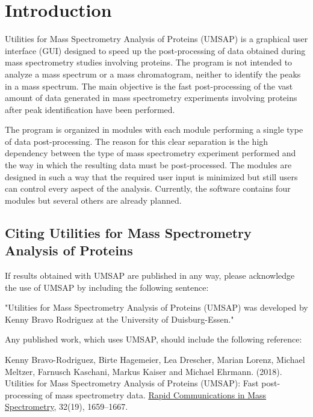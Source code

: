 \chapter{Introduction}

Utilities for Mass Spectrometry Analysis of Proteins (UMSAP) is a graphical user interface (GUI) designed to speed up the post-processing of data obtained during mass spectrometry studies involving proteins. The program is not intended to analyze a mass spectrum or a mass chromatogram, neither to identify the peaks in a mass spectrum. The main objective is the fast post-processing of the vast amount of data generated in mass spectrometry experiments involving proteins after peak identification have been performed.

The program is organized in modules with each module performing a single type of data post-processing. The reason for this clear separation is the high dependency between the type of mass spectrometry experiment performed and the way in which the resulting data must be post-processed. The modules are designed in such a way that the required user input is minimized but still users can control every aspect of the analysis. Currently, the software contains four modules but several others are already planned. 

\section{Citing Utilities for Mass Spectrometry Analysis of Proteins}

If results obtained with UMSAP are published in any way, please acknowledge the use of UMSAP by including the following sentence:

"Utilities for Mass Spectrometry Analysis of Proteins (UMSAP) was developed by Kenny Bravo Rodriguez at the University of Duisburg-Essen."

Any published work, which uses UMSAP, should include the following reference:

Kenny Bravo-Rodriguez, Birte Hagemeier, Lea Drescher, Marian Lorenz, Michael Meltzer, Farnusch Kaschani, Markus Kaiser and Michael Ehrmann. (\num{2018}). Utilities for Mass Spectrometry Analysis of Proteins (UMSAP): Fast post-processing of mass spectrometry data. \href{https://onlinelibrary.wiley.com/doi/10.1002/rcm.8243}{Rapid Communications in Mass Spectrometry}, \num{32}(\num{19}), \numrange[range-phrase = --]{1659}{1667}.

\newpage


